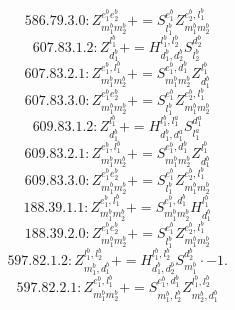 \documentclass[letterpaper,10pt,fleqn,leqno,onecolumn]{article}
\begin{document}
\begin{equation} \;\;\;\;\;\;  586.79.3.0: Z^{e_{1}^{b}e_{2}^{b}}_{m_{1}^{b}m_{2}^{b}}+=S^{e_{1}^{b}}_{l_{1}^{b}}Z^{e_{2}^{b},l_{1}^{b}}_{m_{1}^{b}m_{2}^{b}} \end{equation}
\begin{equation} \;\;\;\;\;\;  607.83.1.2: Z^{l_{1}^{b}}_{d_{1}^{b}}+=H^{l_{1}^{b},l_{2}^{b}}_{d_{1}^{b},d_{2}^{b}}S^{d_{2}^{b}}_{l_{2}^{b}} \end{equation}
\begin{equation} \;\;\;\;\;\;  607.83.2.1: Z^{e_{1}^{b},l_{1}^{b}}_{m_{1}^{b}m_{2}^{b}}+=S^{e_{1}^{b},d_{1}^{b}}_{m_{1}^{b}m_{2}^{b}}Z^{l_{1}^{b}}_{d_{1}^{b}} \end{equation}
\begin{equation} \;\;\;\;\;\;  607.83.3.0: Z^{e_{1}^{b}e_{2}^{b}}_{m_{1}^{b}m_{2}^{b}}+=S^{e_{1}^{b}}_{l_{1}^{b}}Z^{e_{2}^{b},l_{1}^{b}}_{m_{1}^{b}m_{2}^{b}} \end{equation}
\begin{equation} \;\;\;\;\;\;  609.83.1.2: Z^{l_{1}^{b}}_{d_{1}^{b}}+=H^{l_{1}^{b},l_{1}^{a}}_{d_{1}^{b},d_{1}^{a}}S^{d_{1}^{a}}_{l_{1}^{a}} \end{equation}
\begin{equation} \;\;\;\;\;\;  609.83.2.1: Z^{e_{1}^{b},l_{1}^{b}}_{m_{1}^{b}m_{2}^{b}}+=S^{e_{1}^{b},d_{1}^{b}}_{m_{1}^{b}m_{2}^{b}}Z^{l_{1}^{b}}_{d_{1}^{b}} \end{equation}
\begin{equation} \;\;\;\;\;\;  609.83.3.0: Z^{e_{1}^{b}e_{2}^{b}}_{m_{1}^{b}m_{2}^{b}}+=S^{e_{1}^{b}}_{l_{1}^{b}}Z^{e_{2}^{b},l_{1}^{b}}_{m_{1}^{b}m_{2}^{b}} \end{equation}
\begin{equation} \;\;\;\;\;\;  188.39.1.1: Z^{e_{1}^{b},l_{1}^{b}}_{m_{1}^{b}m_{2}^{b}}+=S^{e_{1}^{b},d_{1}^{b}}_{m_{1}^{b}m_{2}^{b}}H^{l_{1}^{b}}_{d_{1}^{b}} \end{equation}
\begin{equation} \;\;\;\;\;\;  188.39.2.0: Z^{e_{1}^{b}e_{2}^{b}}_{m_{1}^{b}m_{2}^{b}}+=S^{e_{1}^{b}}_{l_{1}^{b}}Z^{e_{2}^{b},l_{1}^{b}}_{m_{1}^{b}m_{2}^{b}} \end{equation}
\begin{equation} \;\;\;\;\;\;  597.82.1.2: Z^{l_{1}^{b},l_{2}^{b}}_{m_{1}^{b},d_{1}^{b}}+=H^{l_{1}^{b},l_{2}^{b}}_{d_{1}^{b},d_{2}^{b}}S^{d_{2}^{b}}_{m_{1}^{b}}\cdot -1. \end{equation}
\begin{equation} \;\;\;\;\;\;  597.82.2.1: Z^{e_{1}^{b},l_{1}^{b}}_{m_{1}^{b}m_{2}^{b}}+=S^{e_{1}^{b},d_{1}^{b}}_{m_{1}^{b},l_{2}^{b}}Z^{l_{1}^{b},l_{2}^{b}}_{m_{2}^{b},d_{1}^{b}} \end{equation}
\end{document}
